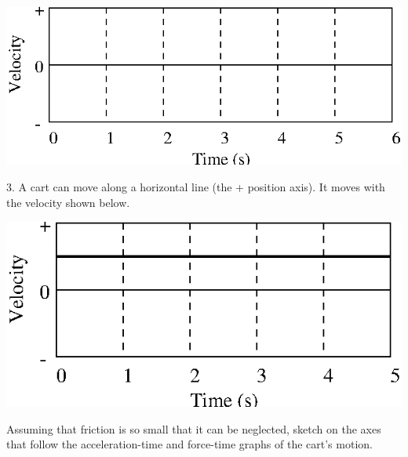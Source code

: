 \vspace{0.3cm}
{\par\centering \includegraphics{force1/force1_fig7.eps} \par}
\vspace{0.3cm}

3. A cart can move along a horizontal line (the + position axis). It moves with
the velocity shown below.

\vspace{0.3cm}
{\par\centering \includegraphics{force1/force1_fig8.eps} \par}
\vspace{0.3cm}

\pagebreak[2]
Assuming that friction is so small that it can be neglected, sketch on the axes
that follow the acceleration-time and force-time graphs of the cart's motion.

